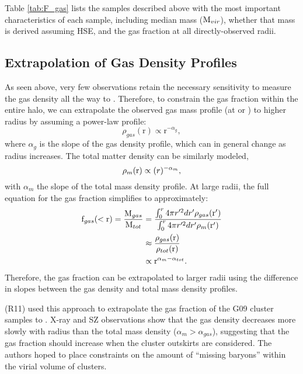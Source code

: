 Table \ref{tab:F_gas} lists the samples described above with the most
important characteristics of each sample, including median mass
($\textrm{M\ensuremath{_{vir}}}$), whether that mass is derived assuming HSE, and the gas
fraction at all directly-observed radii.



\subsection{Extrapolation of Gas Density Profiles}
\label{sec:Gas.Extrapolation}
As seen above, very few observations retain the necessary sensitivity to
measure the gas density all the way to \rvir{}. Therefore, to
constrain the gas fraction within the entire halo, we can extrapolate
the observed gas mass profile (at \rtwo{} or \rfive{}) to higher
radius by assuming a power-law profile:
\begin{equation}
\rho_{gas}(\textrm{r}) \propto \textrm{r}^{-\alpha_g}, \nonumber
\end{equation}
where $\alpha{}_g$ is the slope of the gas density profile, which can in
general change as radius increases. The total
matter density can be similarly modeled,
\begin{equation}
\rho_{m}(\textrm{r}) \propto \textrm(r)^{-\alpha_{m}}, \nonumber
\end{equation}
with $\alpha{}_m$ the slope of the total mass density profile. At
large radii, the full equation for the gas fraction simplifies to approximately:
\begin{align}
\textrm{f\ensuremath{_{gas}}}(<\textrm{r}) = \frac{\textrm{M}_{gas}}{\textrm{M}_{tot}} &=
\frac{\int_0^r 4\pi{}r'^2dr'\rho_{gas}(\textrm{r}')}{\int_0^r
  4\pi{}r'^2dr'\rho_{m}(\textrm{r}')} \nonumber \\ & \approx
\frac{\rho_{gas}(\textrm{r})}{\rho_{tot}(\textrm{r})} \nonumber\\ &\propto \textrm{r}^{\alpha_{m} - \alpha_{tot}}. \nonumber
\end{align}
Therefore, the gas fraction can be extrapolated to larger radii using
the difference in slopes between the gas density and total mass
density profiles.

\textbf{\citet{Rasheed2011}} (R11) used this approach to extrapolate
the gas fraction of the G09 cluster samples to \rvir{}. X-ray and SZ
observations show that the gas density decreases more slowly with
radius than the total mass density ($\alpha_{m} > \alpha_{gas}$),
suggesting that the gas fraction should increase when the cluster
outskirts are considered. The authors hoped to place constraints on
the amount of ``missing baryons'' within the virial volume of
clusters.

